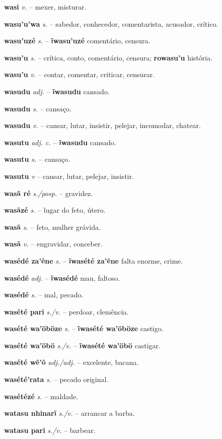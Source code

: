 \textbf{wasi} \textit{v.} -- mexer, misturar.

\textbf{wasu'u'wa} \textit{s.} -- sabedor, conhecedor, comentarista, acusador, crítico.

\textbf{wasu'uzé} \textit{s.} -- \textbf{ĩwasu'uzé} comentário, censura.

\textbf{wasu'u} \textit{s.} -- crítica, conto, comentário, censura; \textbf{rowasu'u} história.

\textbf{wasu'u} \textit{v.} -- contar, comentar, criticar, censurar.

\textbf{wasudu} \textit{adj.} -- \textbf{ĩwasudu} cansado.

\textbf{wasudu} \textit{s.} -- cansaço.

\textbf{wasudu} \textit{v.} -- cansar, lutar, insistir, pelejar, incomodar, chatear.

\textbf{wasutu} \textit{adj. c.} -- \textbf{ĩwasudu} cansado.

\textbf{wasutu} \textit{s.} -- cansaço.

\textbf{wasutu} \textit{v} -- cansar, lutar, pelejar, insistir.

\textbf{wasã ré} \textit{s./posp.} -- gravidez.

\textbf{wasãzé} \textit{s.} -- lugar do feto, útero.

\textbf{wasã} \textit{s.} -- feto, mulher grávida.

\textbf{wasã} \textit{v.} -- engravidar, conceber.

\textbf{wasédé za'ẽne} \textit{s.} -- \textbf{ĩwasété za'ẽne} falta enorme, crime.

\textbf{wasédé} \textit{adj.} -- \textbf{ĩwasédé} mau, faltoso.

\textbf{wasédé} \textit{s.} -- mal, pecado.

\textbf{wasété pari} \textit{s./v.} -- perdoar, clemência.

\textbf{wasété wa'öböze} \textit{s.} -- \textbf{ĩwasété wa'öböze} castigo.

\textbf{wasété wa'öbö} \textit{s./v.} -- \textbf{ĩwasété wa'öbö} castigar.

\textbf{wasété wẽ'õ} \textit{adj./adj.} -- excelente, bacana.

\textbf{wasété'rata} \textit{s.} -- pecado original.

\textbf{wasétézé} \textit{s.} -- maldade.

\textbf{watasu nhinarĩ} \textit{s./v.} -- arrancar a barba.

\textbf{watasu pari} \textit{s./v.} -- barbear.

